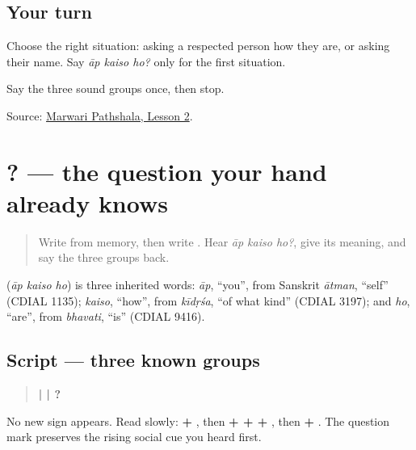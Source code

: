 \subsection*{Your turn}
Choose the right situation: asking a respected person how they are, or asking their name. Say \emph{āp kaiso ho?} only for the first situation.

\begin{tcolorbox}[breakable,colback=teal!4,colframe=teal!35!black,title={Before you move on}]
Say the three sound groups once, then stop.

Source: \href{https://www.marwaripathshala.com/marwari-lesson-2-english}{Marwari Pathshala, Lesson 2}.
\end{tcolorbox}
\section[\texorpdfstring{\mw{आप} \mw{कैसो} \mw{हो}? (āp kaiso ho?)}{आप कैसो हो? (āp kaiso ho?)}]{  ? — the question your hand already knows}

\label{lesson:MW-C06-question}



\begin{quote}
Write \textbf{} from memory, then write \textbf{}. Hear \emph{āp kaiso ho?}, give its meaning, and say the three groups back.
\end{quote}

\begin{cousinweb}
\textbf{  } (\emph{āp kaiso ho}) is three inherited words: \emph{āp}, \textquotedblleft{}you\textquotedblright{}, from Sanskrit \emph{ātman}, \textquotedblleft{}self\textquotedblright{} (CDIAL 1135); \emph{kaiso}, \textquotedblleft{}how\textquotedblright{}, from \emph{kīdṛśa}, \textquotedblleft{}of what kind\textquotedblright{} (CDIAL 3197); and \emph{ho}, \textquotedblleft{}are\textquotedblright{}, from \emph{bhavati}, \textquotedblleft{}is\textquotedblright{} (CDIAL 9416).
\end{cousinweb}

\subsection*{Script — three known groups}
\begin{quote}
\textbf{ |  | ?}
\end{quote}

No new sign appears. Read slowly: \textbf{ + }, then \textbf{ +  +  + }, then \textbf{ + }. The question mark preserves the rising social cue you heard first.

